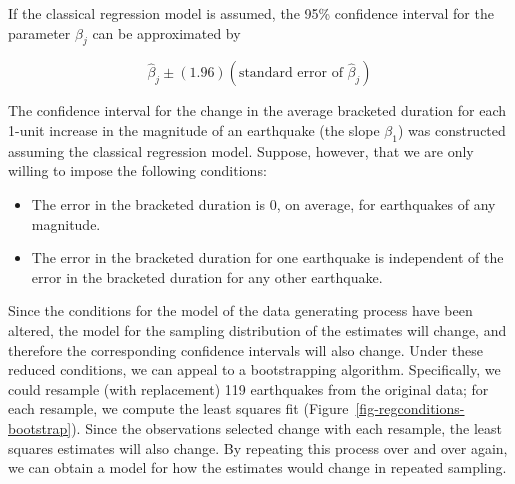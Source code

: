 \documentclass[
  letterpaper,
  DIV=11,
  numbers=noendperiod]{scrreprt}
\providecommand{\tightlist}{%
  \setlength{\itemsep}{0pt}\setlength{\parskip}{0pt}}\usepackage{longtable,booktabs,array}
\theoremstyle{definition}
\theoremstyle{definition}
\theoremstyle{plain}
\theoremstyle{remark}
\begin{document}
\begin{tcolorbox}[enhanced jigsaw, colbacktitle=quarto-callout-note-color!10!white, colback=white, left=2mm, title=\textcolor{quarto-callout-note-color}{\faInfo}\hspace{0.5em}{Formula for Confidence Interval Under Classical Regression Model}, toptitle=1mm, leftrule=.75mm, breakable, bottomrule=.15mm, arc=.35mm, rightrule=.15mm, toprule=.15mm, coltitle=black, opacityback=0, colframe=quarto-callout-note-color-frame, opacitybacktitle=0.6, bottomtitle=1mm, titlerule=0mm]

If the classical regression model is assumed, the 95\% confidence
interval for the parameter \(\beta_j\) can be approximated by

\[\widehat{\beta}_j \pm (1.96)\left(\text{standard error of } \widehat{\beta}_j\right)\]

\end{tcolorbox}

The confidence interval for the change in the average bracketed duration
for each 1-unit increase in the magnitude of an earthquake (the slope
\(\beta_1\)) was constructed assuming the classical regression model.
Suppose, however, that we are only willing to impose the following
conditions:

\begin{itemize}
\tightlist
\item
  The error in the bracketed duration is 0, on average, for earthquakes
  of any magnitude.
\item
  The error in the bracketed duration for one earthquake is independent
  of the error in the bracketed duration for any other earthquake.
\end{itemize}

Since the conditions for the model of the data generating process have
been altered, the model for the sampling distribution of the estimates
will change, and therefore the corresponding confidence intervals will
also change. Under these reduced conditions, we can appeal to a
bootstrapping algorithm. Specifically, we could resample (with
replacement) 119 earthquakes from the original data; for each resample,
we compute the least squares fit
(Figure~\ref{fig-regconditions-bootstrap}). Since the observations
selected change with each resample, the least squares estimates will
also change. By repeating this process over and over again, we can
obtain a model for how the estimates would change in repeated sampling.
\end{document}
